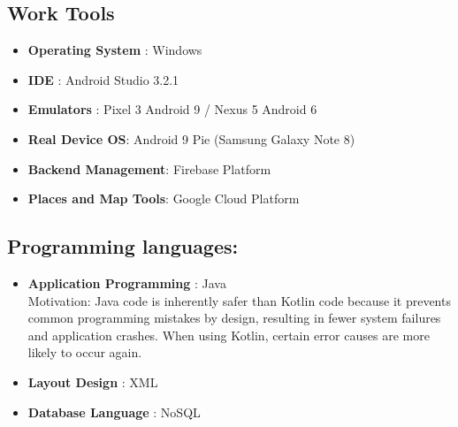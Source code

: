 \subsection{Work Tools}
\begin{itemize}
\item \textbf{Operating System }: Windows 
\item \textbf{IDE }: Android Studio 3.2.1
\item \textbf{Emulators }: Pixel 3 Android 9 / Nexus 5 Android 6
\item \textbf{Real Device OS}: Android 9 Pie (Samsung Galaxy Note 8)
\item \textbf{Backend Management}: Firebase Platform
\item \textbf{Places and Map Tools}: Google Cloud Platform
\end{itemize}
 

\subsection{Programming languages:} 
\begin{itemize}
\item \textbf{Application Programming }: Java\\

Motivation: Java code is inherently safer than Kotlin code because it prevents common programming mistakes by design, resulting in fewer system failures and application crashes. When using Kotlin, certain error causes are more likely to occur again.
\item \textbf{Layout Design }: XML
\item \textbf{Database Language }: NoSQL
\end{itemize}

